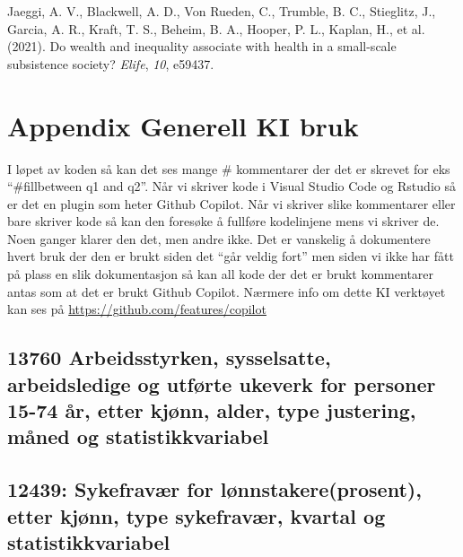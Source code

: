 \documentclass[
  12pt,
  a4paper,
  DIV=11,
  numbers=noendperiod]{scrartcl}
\newlength{\cslhangindent}
\newenvironment{CSLReferences}[2] %
 {\begin{list}{}{%
  \setlength{\itemindent}{0pt}
  \setlength{\leftmargin}{0pt}
  \setlength{\parsep}{0pt}
  \ifodd #1
   \setlength{\leftmargin}{\cslhangindent}
   \setlength{\itemindent}{-1\cslhangindent}
  \fi
  \setlength{\itemsep}{#2\baselineskip}}}
 {\end{list}}
\begin{document}
\label{refs}
\begin{CSLReferences}{1}{0}
Jaeggi, A. V., Blackwell, A. D., Von Rueden, C., Trumble, B. C.,
Stieglitz, J., Garcia, A. R., Kraft, T. S., Beheim, B. A., Hooper, P.
L., Kaplan, H., et al. (2021). Do wealth and inequality associate with
health in a small-scale subsistence society? \emph{Elife}, \emph{10},
e59437.

\end{CSLReferences}

\clearpage

\appendix

\section {Appendix Generell KI bruk}

I løpet av koden så kan det ses mange \# kommentarer der det er skrevet
for eks ``\#fillbetween q1 and q2''. Når vi skriver kode i Visual Studio
Code og Rstudio så er det en plugin som heter Github Copilot. Når vi
skriver slike kommentarer eller bare skriver kode så kan den foresøke å
fullføre kodelinjene mens vi skriver de. Noen ganger klarer den det, men
andre ikke. Det er vanskelig å dokumentere hvert bruk der den er brukt
siden det ``går veldig fort'' men siden vi ikke har fått på plass en
slik dokumentasjon så kan all kode der det er brukt kommentarer antas
som at det er brukt Github Copilot. Nærmere info om dette KI verktøyet
kan ses på \url{https://github.com/features/copilot}

\clearpage

\subsection{13760 Arbeidsstyrken, sysselsatte, arbeidsledige og utførte
ukeverk for personer 15-74 år, etter kjønn, alder, type justering, måned
og
statistikkvariabel}\label{arbeidsstyrken-sysselsatte-arbeidsledige-og-utfuxf8rte-ukeverk-for-personer-15-74-uxe5r-etter-kjuxf8nn-alder-type-justering-muxe5ned-og-statistikkvariabel}

\subsection{12439: Sykefravær for lønnstakere(prosent), etter kjønn,
type sykefravær, kvartal og
statistikkvariabel}\label{sykefravuxe6r-for-luxf8nnstakereprosent-etter-kjuxf8nn-type-sykefravuxe6r-kvartal-og-statistikkvariabel}
\end{document}
